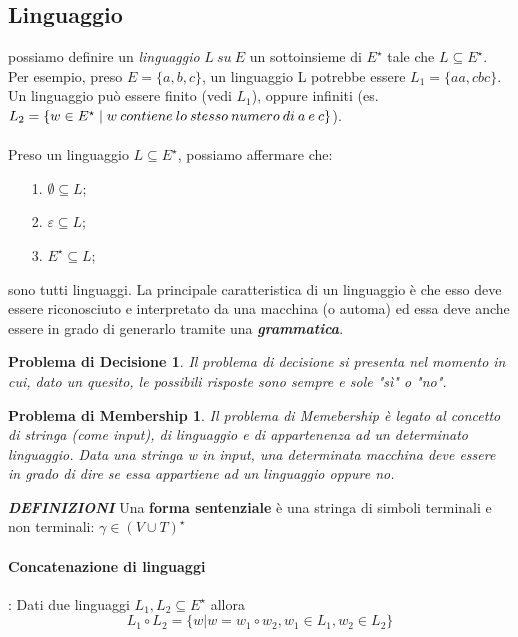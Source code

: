 \documentclass[11pt]{article}
\newtheorem*{problemaDecisione}{Problema di Decisione}
\newtheorem*{problemaMembership}{Problema di Membership}
\begin{document}
\subsection{Linguaggio} possiamo definire un \textit{linguaggio} $L \medspace su \medspace E$ un sottoinsieme di $E^{\star}$ tale che $L \subseteq E^{\star}$. Per esempio, preso $E = \{a,b,c\}$, un linguaggio L potrebbe essere $L_{1}=\{aa,cbc\}$. Un linguaggio può essere finito (vedi $L_ {1}$), oppure infiniti (es. $L_{2} = \{ w \in E^{\star} \thickspace | \thickspace w \medspace contiene \medspace lo \medspace stesso \medspace numero \medspace di \medspace a \medspace e \medspace c\}$).
\\ \\
Preso un linguaggio $L \subseteq E^{\star}$, possiamo affermare che:
\begin{itemize}
\item[1.] $ \emptyset \subseteq L$;
\item[2.] $ \varepsilon \subseteq L $;
\item[3.] $ E^{\star} \subseteq L$;
\end{itemize}
sono tutti linguaggi. La principale caratteristica di un linguaggio è che esso deve essere riconosciuto e interpretato da una macchina (o automa) ed essa deve anche essere in grado di generarlo tramite una \textbf{\textit{grammatica}}.
\begin{problemaDecisione}
Il problema di decisione si presenta nel momento in cui, dato un quesito, le possibili risposte sono sempre e sole "sì" o "no".
\end{problemaDecisione}
\begin{problemaMembership}
Il problema di Memebership è legato al concetto di stringa (come input), di linguaggio e di appartenenza ad un determinato linguaggio. Data una stringa w in input, una determinata macchina deve essere in grado di dire se essa appartiene ad un linguaggio oppure no.
\end{problemaMembership}

\textbf{\textit{DEFINIZIONI}}
Una \textbf{forma sentenziale} è una stringa di simboli terminali e non terminali: $\gamma \in (V \cup T)^{\star}$

\paragraph{Concatenazione di linguaggi}: Dati due linguaggi $L_1, L_2 \subseteq E^{\star}$ allora $$L_1 \circ L_2 = \{ w | w = w_1 \circ w_2, w_1 \in L_1, w_2 \in L_2\} $$
\end{document}
